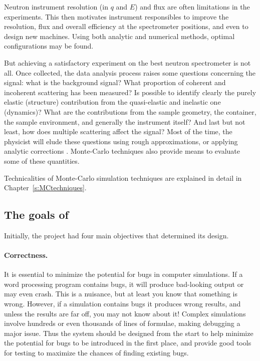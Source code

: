 Neutron instrument resolution (in $q$ and $E$) and flux are often limitations in the
experiments. This then motivates instrument responsibles to improve
the resolution, flux and overall efficiency at the spectrometer positions, and
even to design new machines. Using both analytic and numerical
methods, optimal configurations may be found.

But achieving a satisfactory experiment on the best neutron
spectrometer is not all. Once collected, the data analysis process
raises some questions concerning the signal: what is the background
signal? What proportion of coherent and incoherent scattering has
been measured? Is possible to identify clearly the purely elastic
(structure) contribution from the quasi-elastic and inelastic one
(dynamics)? What are the contributions from the sample geometry, the
container, the sample environment, and generally the instrument
itself? And last but not least, how does multiple scattering affect the
signal? Most of the time, the physicist will elude these questions
using rough approximations, or applying analytic corrections
\cite{Copley86}. Monte-Carlo techniques also provide means to evaluate
some of these quantities.

Technicalities of Monte-Carlo simulation
techniques are explained in detail in Chapter~\ref{s:MCtechniques}.

\subsection{The goals of \MCS}
\label{s:goals}

Initially, the \MCS project had four main objectives
that determined its design.

\paragraph{Correctness.}
It is essential to minimize the potential for bugs in computer
simulations.  If a word processing program contains bugs, it will
produce bad-looking output or may even crash. This is a nuisance, but at
least you know that something is wrong. However, if a simulation
contains bugs it produces wrong results, and unless the results are far
off, you may not know about it! Complex simulations involve hundreds or
even thousands of lines of formulae, making debugging a major issue. Thus the
system should be designed from the start to help minimize the potential
for bugs to be introduced in the first place, and provide good tools for
testing to maximize the chances of finding existing bugs.
%
